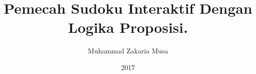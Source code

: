 \documentclass[a4paper,12pt,oneside]{book}
\title{Pemecah Sudoku Interaktif Dengan Logika Proposisi.}\let\Title\@title   %
\author{Muhammad Zakaria Musa}  \let\Author\@author  %
\date{2017}           \let\Date\@date %
\newif\iflogTA
\begin{document}
\begin{titlepage}
\thispagestyle{empty}

\pagebreak
\iflogTA

\pagebreak
\fi
\thispagestyle{empty}

\pagebreak
\end{titlepage}

\iflogTA
\pagebreak
\addcontentsline{toc}{chapter}{Abstract}

\pagebreak
\addcontentsline{toc}{chapter}{Lembar Persembahan}

\pagebreak
\addcontentsline{toc}{chapter}{Kata Pengantar}

\pagebreak
\fi
\cleardoublepage
{}
\tableofcontents
\iflogTA
\newpage
\cleardoublepage
\addcontentsline{toc}{chapter}{Daftar Gambar}
\listoffigures
\newpage
\cleardoublepage
\addcontentsline{toc}{chapter}{Daftar Tabel}
\listoftables
\fi
%
\cleardoublepage
{}

%

%

%
%
%
%
%
\cleardoublepage
{}

%
\cleardoublepage
{}

\end{document}

